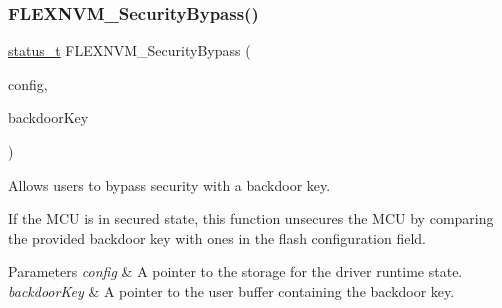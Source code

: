 \subsubsection{\texorpdfstring{FLEXNVM\_SecurityBypass()}{FLEXNVM\_SecurityBypass()}}
{\footnotesize\ttfamily \mbox{\hyperlink{group__ksdk__common_gaaabdaf7ee58ca7269bd4bf24efcde092}{status\+\_\+t}} F\+L\+E\+X\+N\+V\+M\+\_\+\+Security\+Bypass (\begin{DoxyParamCaption}\item[{\mbox{\hyperlink{group__ftfx__flexnvm__driver_ga8fd4d473c0a4b30cac163160fb28a6c1}{flexnvm\+\_\+config\+\_\+t}} $\ast$}]{config,  }\item[{const uint8\+\_\+t $\ast$}]{backdoor\+Key }\end{DoxyParamCaption})}



Allows users to bypass security with a backdoor key. 

If the M\+CU is in secured state, this function unsecures the M\+CU by comparing the provided backdoor key with ones in the flash configuration field.


\begin{DoxyParams}{Parameters}
{\em config} & A pointer to the storage for the driver runtime state. \\
\hline
{\em backdoor\+Key} & A pointer to the user buffer containing the backdoor key.\\
\hline
\end{DoxyParams}

